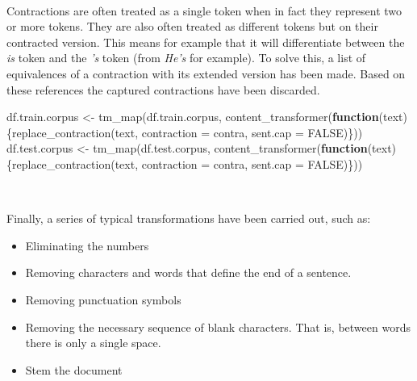 \documentclass[
]{article}
\newenvironment{Shaded}{\begin{snugshade}}{\end{snugshade}}
\newcommand{\AttributeTok}[1]{\textcolor[rgb]{0.77,0.63,0.00}{#1}}
\newcommand{\ConstantTok}[1]{\textcolor[rgb]{0.00,0.00,0.00}{#1}}
\newcommand{\ControlFlowTok}[1]{\textcolor[rgb]{0.13,0.29,0.53}{\textbf{#1}}}
\newcommand{\FunctionTok}[1]{\textcolor[rgb]{0.00,0.00,0.00}{#1}}
\newcommand{\NormalTok}[1]{#1}
\newcommand{\OtherTok}[1]{\textcolor[rgb]{0.56,0.35,0.01}{#1}}
\providecommand{\tightlist}{%
  \setlength{\itemsep}{0pt}\setlength{\parskip}{0pt}}
\begin{document}
~

Contractions are often treated as a single token when in fact they
represent two or more tokens. They are also often treated as different
tokens but on their contracted version. This means for example that it
will differentiate between the \emph{is} token and the \emph{'s} token
(from \emph{He's} for example). To solve this, a list of equivalences of
a contraction with its extended version has been made. Based on these
references the captured contractions have been discarded.

\begin{Shaded}
\begin{Highlighting}[]
\NormalTok{df.train.corpus }\OtherTok{\textless{}{-}} \FunctionTok{tm\_map}\NormalTok{(df.train.corpus, }\FunctionTok{content\_transformer}\NormalTok{(}\ControlFlowTok{function}\NormalTok{(text)\{}\FunctionTok{replace\_contraction}\NormalTok{(text, }\AttributeTok{contraction =}\NormalTok{ contra, }\AttributeTok{sent.cap =} \ConstantTok{FALSE}\NormalTok{)\}))}
\NormalTok{df.test.corpus }\OtherTok{\textless{}{-}} \FunctionTok{tm\_map}\NormalTok{(df.test.corpus, }\FunctionTok{content\_transformer}\NormalTok{(}\ControlFlowTok{function}\NormalTok{(text)\{}\FunctionTok{replace\_contraction}\NormalTok{(text, }\AttributeTok{contraction =}\NormalTok{ contra, }\AttributeTok{sent.cap =} \ConstantTok{FALSE}\NormalTok{)\}))}
\end{Highlighting}
\end{Shaded}

~

Finally, a series of typical transformations have been carried out, such
as:

\begin{itemize}
\tightlist
\item
  Eliminating the numbers
\item
  Removing characters and words that define the end of a sentence.
\item
  Removing punctuation symbols
\item
  Removing the necessary sequence of blank characters. That is, between
  words there is only a single space.
\item
  Stem the document
\end{itemize}
\end{document}
